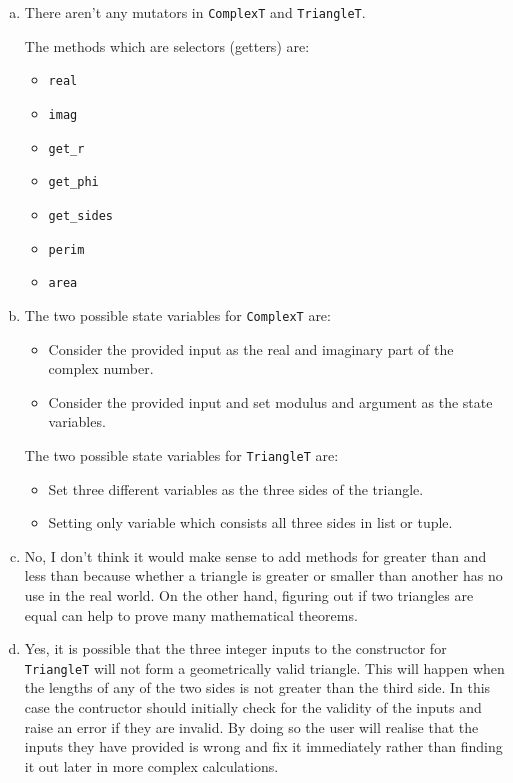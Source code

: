 \documentclass[12pt]{article}
\begin{document}
\begin{enumerate}[(a)]
	\item There aren't any mutators in \verb|ComplexT| and \verb|TriangleT|.

	The methods which are selectors (getters) are:
		\begin{itemize}
			\item \verb|real|
			\item \verb|imag|
			\item \verb|get_r|
			\item \verb|get_phi|
			\item \verb|get_sides|
			\item \verb|perim|
			\item \verb|area|
		\end{itemize}

	\item The two possible state variables for \verb|ComplexT| are:
		\begin{itemize}
			\item Consider the provided input as the real and imaginary part of the complex 
			number.
			\item Consider the provided input and set modulus and argument as the state variables.
		\end{itemize}

		The two possible state variables for \verb|TriangleT| are:
		\begin{itemize}
			\item Set three different variables as the three sides of the triangle.
			\item Setting only variable which consists all three sides in list or tuple.
		\end{itemize}

	\item No, I don't think it would make sense to add methods for greater than and less than because whether a triangle is greater or smaller than another has no use in the real world. On the other hand, figuring out if two triangles are equal can help to prove many mathematical theorems.

	\item Yes, it is possible that the three integer inputs to the constructor for \verb|TriangleT| will not form a geometrically valid triangle. This will happen when the lengths of any of the two sides is not greater than the third side. In this case the contructor should initially check for the validity of the inputs and raise an error if they are invalid. By doing so the user will realise that the inputs they have provided is wrong and fix it immediately rather than finding it out later in more complex calculations.


\end{enumerate}
\end{document}
